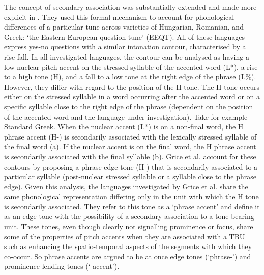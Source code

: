 The concept of secondary association was substantially extended and made more explicit in \citet{Grice.etal2000}. They used this formal mechanism to account for phonological differences of a particular tune across varieties of Hungarian, Romanian, and Greek: ‘the Eastern European question tune’ (EEQT). All of these languages express yes-no questions with a similar intonation contour, characterised by a rise-fall. In all investigated languages, the contour can be analysed as having a low nuclear pitch accent on the stressed syllable of the accented word (L*), a rise to a high tone (H), and a fall to a low tone at the right edge of the phrase (L\%). However, they differ with regard to the position of the H tone. The H tone occurs either on the stressed syllable in a word occurring after the accented word or on a specific syllable close to the right edge of the phrase (dependent on the position of the accented word and the language under investigation). Take for example Standard Greek. When the nuclear accent (L*) is on a non-final word, the H phrase accent (H-) is secondarily associated with the lexically stressed syllable of the final word (a). If the nuclear accent is on the final word, the H phrase accent is secondarily associated with the final syllable (b). Grice et al. account for these contours by proposing a phrase edge tone (H-) that is secondarily associated to a particular syllable (post-nuclear stressed syllable or a syllable close to the phrase edge). Given this analysis, the languages investigated by Grice et al. share the same phonological representation differing only in the unit with which the H tone is secondarily associated. They refer to this tone as a ‘phrase accent’ and define it as an edge tone with the possibility of a secondary association to a tone bearing unit. These tones, even though clearly not signalling prominence or focus, share some of the properties of pitch accents when they are associated with a TBU such as enhancing the spatio-temporal aspects of the segments with which they co-occur. So phrase accents are argued to be at once edge tones (‘phrase-’) and prominence lending tones (‘-accent’). 

